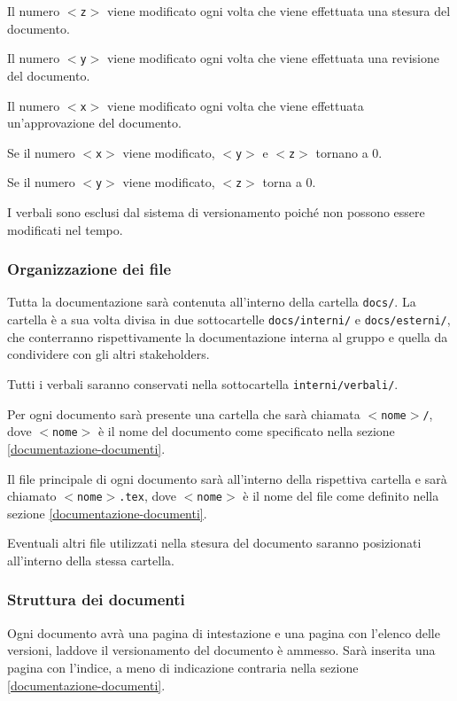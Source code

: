 \documentclass[a4paper, 12pt]{article}
\begin{document}
Il numero \texttt{$<$z$>$} viene modificato ogni volta che viene effettuata una stesura del documento.

Il numero \texttt{$<$y$>$} viene modificato ogni volta che viene effettuata una revisione del documento.

Il numero \texttt{$<$x$>$} viene modificato ogni volta che viene effettuata un'approvazione del documento.

Se il numero \texttt{$<$x$>$} viene modificato, \texttt{$<$y$>$} e \texttt{$<$z$>$} tornano a 0.

Se il numero \texttt{$<$y$>$} viene modificato, \texttt{$<$z$>$} torna a 0.

I verbali sono esclusi dal sistema di versionamento poiché non possono essere modificati nel tempo.

\subsubsection{Organizzazione dei file}
Tutta la documentazione sarà contenuta all'interno della cartella \texttt{docs/}. La cartella è a sua volta divisa in due sottocartelle \texttt{docs/interni/} e \texttt{docs/esterni/}, che conterranno rispettivamente la documentazione interna al gruppo e quella da condividere con gli altri stakeholders.

Tutti i verbali saranno conservati nella sottocartella \texttt{interni/verbali/}.

Per ogni documento sarà presente una cartella che sarà chiamata \texttt{$<$nome$>$/}, dove \texttt{$<$nome$>$} è il nome del documento come specificato nella sezione \ref{documentazione-documenti}.

Il file principale di ogni documento sarà all'interno della rispettiva cartella e sarà chiamato \texttt{$<$nome$>$.tex}, dove \texttt{$<$nome$>$} è il nome del file come definito nella sezione \ref{documentazione-documenti}.

Eventuali altri file utilizzati nella stesura del documento saranno posizionati all'interno della stessa cartella.

\subsubsection{Struttura dei documenti}
Ogni documento avrà una pagina di intestazione e una pagina con l'elenco delle versioni, laddove il versionamento del documento è ammesso.
Sarà inserita una pagina con l'indice, a meno di indicazione contraria nella sezione \ref{documentazione-documenti}.
\end{document}
